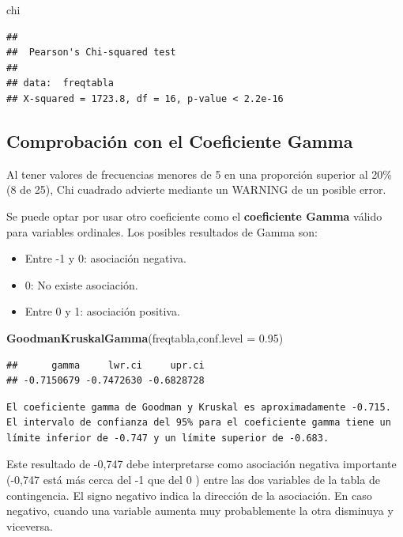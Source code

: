 \documentclass[
  12 pt,
  a4paper,
]{article}
\newenvironment{Shaded}{\begin{snugshade}}{\end{snugshade}}
\newcommand{\AttributeTok}[1]{\textcolor[rgb]{0.13,0.29,0.53}{#1}}
\newcommand{\FloatTok}[1]{\textcolor[rgb]{0.00,0.00,0.81}{#1}}
\newcommand{\FunctionTok}[1]{\textcolor[rgb]{0.13,0.29,0.53}{\textbf{#1}}}
\newcommand{\NormalTok}[1]{#1}
\providecommand{\tightlist}{%
  \setlength{\itemsep}{0pt}\setlength{\parskip}{0pt}}
\begin{document}
\begin{Shaded}
\begin{Highlighting}[]
\NormalTok{chi}
\end{Highlighting}
\end{Shaded}

\begin{verbatim}
## 
##  Pearson's Chi-squared test
## 
## data:  freqtabla
## X-squared = 1723.8, df = 16, p-value < 2.2e-16
\end{verbatim}

\subsection{Comprobación con el Coeficiente
Gamma}\label{comprobaciuxf3n-con-el-coeficiente-gamma}

Al tener valores de frecuencias menores de 5 en una proporción superior
al 20\% (8 de 25), Chi cuadrado advierte mediante un WARNING de un
posible error.

Se puede optar por usar otro coeficiente como el \textbf{coeficiente
Gamma} válido para variables ordinales. Los posibles resultados de Gamma
son:

\begin{itemize}
\tightlist
\item
  Entre -1 y 0: asociación negativa.
\item
  0: No existe asociación.
\item
  Entre 0 y 1: asociación positiva.
\end{itemize}

\begin{Shaded}
\begin{Highlighting}[]
\FunctionTok{GoodmanKruskalGamma}\NormalTok{(freqtabla,}\AttributeTok{conf.level =} \FloatTok{0.95}\NormalTok{)}
\end{Highlighting}
\end{Shaded}

\begin{verbatim}
##      gamma     lwr.ci     upr.ci 
## -0.7150679 -0.7472630 -0.6828728
\end{verbatim}

\begin{verbatim}
El coeficiente gamma de Goodman y Kruskal es aproximadamente -0.715.
El intervalo de confianza del 95% para el coeficiente gamma tiene un límite inferior de -0.747 y un límite superior de -0.683.
\end{verbatim}

Este resultado de -0,747 debe interpretarse como asociación negativa
importante (-0,747 está más cerca del -1 que del 0 ) entre las dos
variables de la tabla de contingencia. El signo negativo indica la
dirección de la asociación. En caso negativo, cuando una variable
aumenta muy probablemente la otra disminuya y viceversa.
\end{document}
